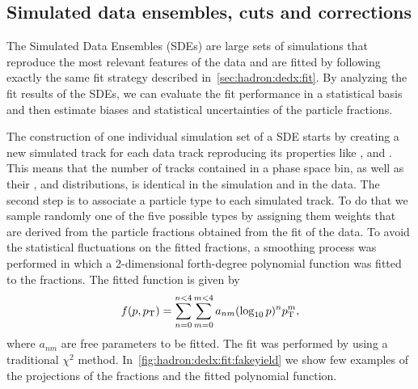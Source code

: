 \subsection{\boldmath Simulated data ensembles, cuts and corrections}
\label{sec:hadron:dedx:sde}

The Simulated Data Ensembles (SDEs) are large sets of
simulations that reproduce the most relevant
features of the data and are fitted by following
exactly the same fit strategy described in~\cref{sec:hadron:dedx:fit}.
By analyzing the fit results of the SDEs, we can evaluate the fit
performance in a statistical basis and then estimate biases
and statistical uncertainties of the particle fractions. 

The construction of one individual simulation set of a SDE starts
by creating a new simulated track for each data track reproducing
its properties like \pp, \pT and \ncl. This means that the number of
tracks contained in a phase space bin, as well as their \pp, \pT and
\ncl distributions, is identical in the simulation and in the data.
The second step is to associate a particle type to each simulated track.
To do that we sample randomly one of the five possible types
by assigning them weights that are derived from the particle fractions
obtained from the \dedx fit of the data.
To avoid the statistical fluctuations on the fitted fractions,
a smoothing process was performed in which a 2-dimensional
forth-degree polynomial function was fitted to the fractions.
The fitted function is given by
\begin{equation}
  f(p,p_\text{T}) = \sum_{n=0}^{n<4} \sum_{m=0}^{m<4} a_{nm} (\log_{10} p)^n p_\text{T}^m,
  \label{eq:hadron:dedx:pol}
\end{equation}
where $a_{nm}$ are free parameters to be fitted.
The fit was performed by using a traditional $\chi^2$ method.
In~\cref{fig:hadron:dedx:fit:fakeyield} we show few examples
of the \pT projections of the fractions and the fitted
polynomial function. 


